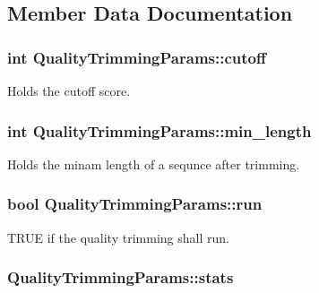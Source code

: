 \subsection{Member Data Documentation}
\hypertarget{struct_quality_trimming_params_a3b2b268123a0054eda2f603e7be590dc}{
\subsubsection[{cutoff}]{\setlength{\rightskip}{0pt plus 5cm}int Quality\-Trimming\-Params\-::cutoff}}\label{struct_quality_trimming_params_a3b2b268123a0054eda2f603e7be590dc}
Holds the cutoff score. \hypertarget{struct_quality_trimming_params_a754750a0a278d17d82a02dedfbf185ba}{
\subsubsection[{min\-\_\-length}]{\setlength{\rightskip}{0pt plus 5cm}int Quality\-Trimming\-Params\-::min\-\_\-length}}\label{struct_quality_trimming_params_a754750a0a278d17d82a02dedfbf185ba}
Holds the minam length of a sequnce after trimming. \hypertarget{struct_quality_trimming_params_a1b2db8d78cae5e3db9d8fc903e042310}{
\subsubsection[{run}]{\setlength{\rightskip}{0pt plus 5cm}bool Quality\-Trimming\-Params\-::run}}\label{struct_quality_trimming_params_a1b2db8d78cae5e3db9d8fc903e042310}
T\-R\-U\-E if the quality trimming shall run. \hypertarget{struct_quality_trimming_params_a5f07878380511531b124c6f94a611b91}{
\subsubsection[{stats}]{ Quality\-Trimming\-Params\-::stats}}\label{struct_quality_trimming_params_a5f07878380511531b124c6f94a611b91}

